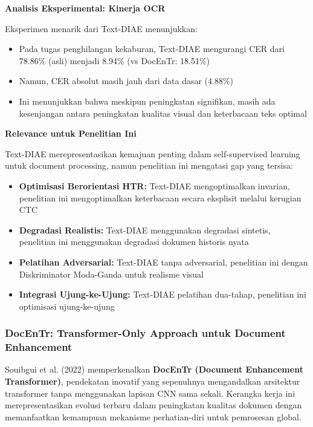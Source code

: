 \documentclass[12pt,a4paper]{article}
\begin{document}
\textbf{Analisis Eksperimental: Kinerja OCR}

Eksperimen menarik dari Text-DIAE menunjukkan:
\begin{itemize}
    \item Pada tugas penghilangan kekaburan, Text-DIAE mengurangi CER dari 78.86\% (asli) menjadi 8.94\% (vs DocEnTr: 18.51\%)
    \item Namun, CER absolut masih jauh dari data dasar (4.88\%)
    \item Ini menunjukkan bahwa meskipun peningkatan signifikan, masih ada kesenjangan antara peningkatan kualitas visual dan keterbacaan teks optimal
\end{itemize}

\textbf{Relevance untuk Penelitian Ini}

Text-DIAE merepresentasikan kemajuan penting dalam self-supervised learning untuk document processing, namun penelitian ini mengatasi gap yang tersisa:

\begin{itemize}
    \item \textbf{Optimisasi Berorientasi HTR:} Text-DIAE mengoptimalkan invarian, penelitian ini mengoptimalkan keterbacaan secara eksplisit melalui kerugian CTC
    \item \textbf{Degradasi Realistis:} Text-DIAE menggunakan degradasi sintetis, penelitian ini menggunakan degradasi dokumen historis nyata
    \item \textbf{Pelatihan Adversarial:} Text-DIAE tanpa adversarial, penelitian ini dengan Diskriminator Moda-Ganda untuk realisme visual
    \item \textbf{Integrasi Ujung-ke-Ujung:} Text-DIAE pelatihan dua-tahap, penelitian ini optimisasi ujung-ke-ujung
\end{itemize}

\subsubsection{DocEnTr: Transformer-Only Approach untuk Document Enhancement}
\label{subsubsec:docentr}

Souibgui et al. (2022) memperkenalkan \textbf{DocEnTr (Document Enhancement Transformer)}, pendekatan inovatif yang sepenuhnya mengandalkan arsitektur transformer tanpa menggunakan lapisan CNN sama sekali. Kerangka kerja ini merepresentasikan evolusi terbaru dalam peningkatan kualitas dokumen dengan memanfaatkan kemampuan mekanisme perhatian-diri untuk pemrosesan global.
\end{document}

